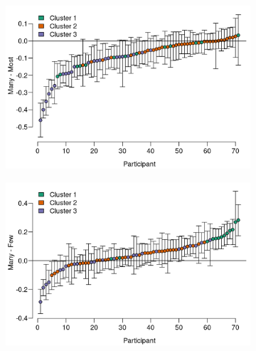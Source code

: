 \documentclass{article}
\begin{document}
\begin{figure} [H]
    
    \begin{subfigure}[b]{0.85\textwidth}
     \includegraphics[width=\linewidth]{Figure2.6a.png}
     \caption{\label{fig:fig2.6a}}
    \end{subfigure}
    
    \begin{subfigure}[b]{0.85\textwidth}
     \includegraphics[width=\linewidth]{Figure2.6b.png}
     \caption{\label{fig:fig2.6b}}
    \end{subfigure}
\end{figure}
\end{document}
